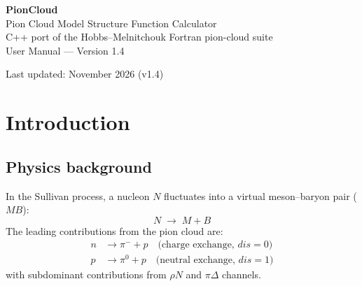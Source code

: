 \documentclass[11pt,a4paper]{article}
\newcommand{\picloud}{\textsc{PionCloud}}
\begin{document}

\begin{titlepage}
\centering
\vspace*{2cm}
{\Huge\bfseries\color{titleblue} PionCloud}\\[0.5em]
{\Large Pion Cloud Model Structure Function Calculator}\\[2em]
{\large C++ port of the Hobbs--Melnitchouk Fortran pion-cloud suite}\\[1em]
{\large User Manual --- Version 1.4}\\[3em]

\begin{abstract}
\noindent
\picloud{} is a modular C++ library and executable for computing the
leading pion-cloud contributions to nucleon structure functions
$F_2^{(\pi N)}(x)$ and $F_2^{(\pi N)}(\theta_h)$ in the Sullivan
process.  It is a direct, validated port of three Fortran programs
(\texttt{3Var\_x.f}, \texttt{3Var\_theta.f}, \texttt{f2\_pi\_sub.f90})
by T.~Hobbs and W.~Melnitchouk, extended with configurable scan modes,
ROOT output, CTEQ6 neutron structure function evaluation, and a static
library interface for embedding in other programs.
The code was developed as a framework for BoNuS/TDIS analysis at JLab.
\end{abstract}

\vfill
{\small Last updated: November 2026 (v1.4)}
\end{titlepage}

\tableofcontents
\newpage

\section{Introduction}

\subsection{Physics background}

In the Sullivan process, a nucleon $N$ fluctuates into a virtual
meson--baryon pair ($M B$):
\begin{equation}
  N \;\longrightarrow\; M + B
\end{equation}
The leading contributions from the pion cloud are:
\begin{align}
  n &\to \pi^- + p \quad \text{(charge exchange, } \mathit{dis}=0\text{)} \\
  p &\to \pi^0 + p \quad \text{(neutral exchange, } \mathit{dis}=1\text{)}
\end{align}
with subdominant contributions from $\rho N$ and $\pi\Delta$ channels.
\end{document}
